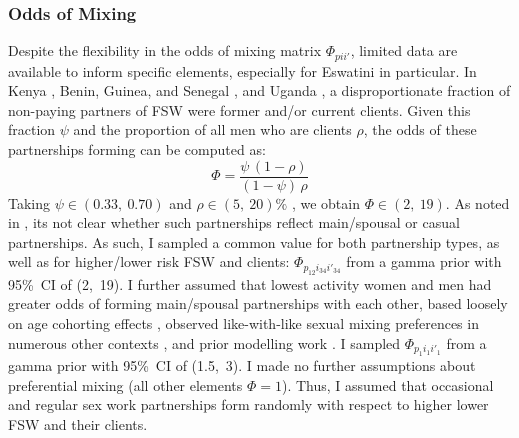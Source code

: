 \subsubsection{Odds of Mixing}
Despite the flexibility in the odds of mixing matrix $\Phi_{pii'}$,
limited data are available to inform specific elements,
especially for Eswatini in particular.
In Kenya \cite{Voeten2007}, Benin, Guinea, and Senegal \cite{Godin2008}, and Uganda \cite{Mbonye2022},
a disproportionate fraction of non-paying partners of FSW were former and/or current clients.
Given this fraction $\psi$ and the proportion of all men who are clients $\rho$,
the odds of these partnerships forming can be computed as:
\begin{equation}
  \Phi = \frac{\psi\,(1-\rho)}{(1-\psi)\,\rho}
\end{equation}
Taking $\psi \in (0.33,~0.70)$ \cite{Voeten2007,Godin2008}
and $\rho \in (5,~20)\%$ \cite{Hodgins2022}, we obtain $\Phi \in (2,~19)$.
As noted in , its not clear whether such partnerships reflect
main/spousal or casual partnerships.
As such, I sampled a common value for both partnership types,
as well as for higher/lower risk FSW and clients:
$\Phi_{p_{12}i_{34}i'_{34}}$ from a gamma prior with 95\%~CI of (2,~19).
I further assumed that lowest activity women and men had
greater odds of forming main/spousal partnerships with each other,
based loosely on age cohorting effects \cite{Leclerc-Madlala2008},
observed like-with-like sexual mixing preferences in numerous other contexts
\cite{Morris1991,Garnett1993a,Admiraal2016},
and prior modelling work \cite{Knight2022-sr}.
I sampled $\Phi_{p_{1}i_{1}i'_{1}}$ from a gamma prior with 95\%~CI of (1.5,~3).
I made no further assumptions about preferential mixing (\ie all other elements $\Phi = 1$).
Thus, I assumed that occasional and regular sex work partnerships form
randomly with respect to higher \vs lower FSW and their clients.
